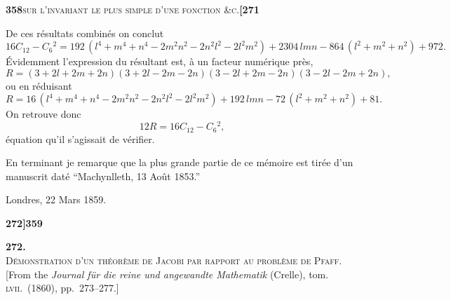 \documentclass[11pt]{article}
\begin{document}
\newpage
\noindent\textbf{358}\hfill\textsc{sur l'invariant le plus simple d'une fonction \&c.}\hfill\textbf{[271}

\medskip

\noindent De ces r\'esultats combin\'es on conclut
\[
16 C_{12} - C_6{}^2 = 192\,(l^4 + m^4 + n^4 - 2 m^2 n^2 - 2 n^2 l^2 - 2 l^2 m^2) + 2304\, l m n - 864\,(l^2 + m^2 + n^2) + 972.
\]
\'Evidemment l'expression du r\'esultant est, \`a un facteur num\'erique pr\`es,
\[
R = (3 + 2 l + 2 m + 2 n)(3 + 2 l - 2 m - 2 n)(3 - 2 l + 2 m - 2 n)(3 - 2 l - 2 m + 2 n),
\]
ou en r\'eduisant
\[
R = 16\,(l^4 + m^4 + n^4 - 2 m^2 n^2 - 2 n^2 l^2 - 2 l^2 m^2) + 192\, l m n - 72\,(l^2 + m^2 + n^2) + 81.
\]
On retrouve donc
\[
12 R = 16 C_{12} - C_6{}^2,
\]
\'equation qu'il s'agissait de v\'erifier.

\medskip

En terminant je remarque que la plus grande partie de ce m\'emoire est tir\'ee d'un manuscrit dat\'e ``Machynlleth, 13 Ao\^ut 1853.''

\medskip

\hfill Londres, 22 Mars 1859.


\newpage
\noindent\textbf{272]}\hfill\textbf{359}

\medskip

\begin{center}
{\Large\bfseries 272.}\\[1em]
{\large\scshape D\'emonstration d'un th\'eor\`eme de Jacobi par rapport au probl\`eme de Pfaff.}\\[1em]
{\small [From the \textit{Journal f\"ur die reine und angewandte Mathematik} (Crelle), tom. \textsc{lvii}.\ (1860), pp.~273--277.]}
\end{center}

\medskip
\end{document}
